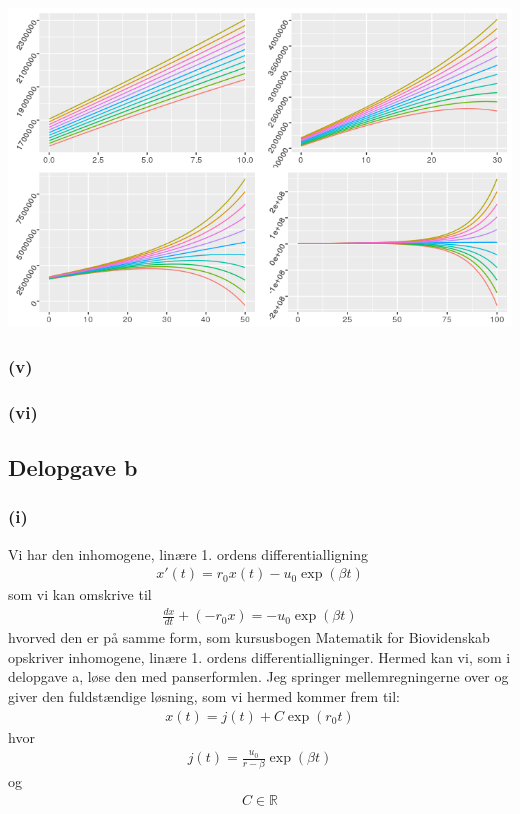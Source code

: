 \documentclass[12pt]{article}
\begin{document}
\includegraphics[scale=0.5]{q3p1.png}

\subsubsection{(v)}

\subsubsection{(vi)}

\subsection{Delopgave b}

\subsubsection{(i)}

Vi har den inhomogene, linære 1. ordens differentialligning
\begin{align}
x'(t) = r_0x(t) - u_0\exp(\beta t)
\end{align}
som vi kan omskrive til  
\begin{align}
\frac{dx}{dt} + (-r_0 x) = - u_0\exp(\beta t)
\end{align}
hvorved den er på samme form, som kursusbogen Matematik for Biovidenskab opskriver inhomogene, linære 1. ordens differentialligninger. Hermed kan vi, som i delopgave a, løse den med panserformlen. Jeg springer mellemregningerne over og giver den fuldstændige løsning, som vi hermed kommer frem til:
\begin{align}
x(t) = j(t) + C \exp(r_0 t )
\end{align}
hvor 
\begin{align}
j(t) = \frac{u_0 }{r - \beta} \exp(\beta t)
\end{align}
og 
\begin{align}
C \in \mathbb{R}
\end{align}
\end{document}
